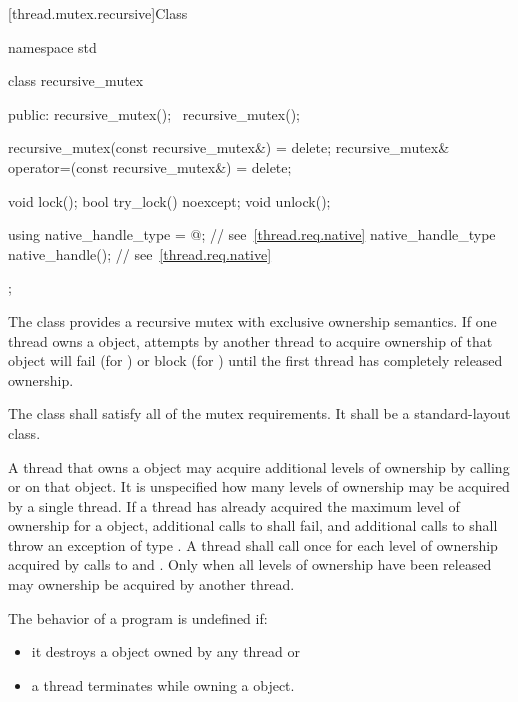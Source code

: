 [thread.mutex.recursive]{Class }

%
\begin{codeblock}
namespace std {
  class recursive_mutex {
  public:
    recursive_mutex();
    ~recursive_mutex();

    recursive_mutex(const recursive_mutex&) = delete;
    recursive_mutex& operator=(const recursive_mutex&) = delete;

    void lock();
    bool try_lock() noexcept;
    void unlock();

    using native_handle_type = @\impdefnc@;          // see~\ref{thread.req.native}
    native_handle_type native_handle();                         // see~\ref{thread.req.native}
  };
}
\end{codeblock}

\pnum
The class  provides a recursive mutex with exclusive ownership
semantics. If one thread owns a  object, attempts by another
thread to acquire ownership of that object will fail (for ) or block
(for ) until the first thread has completely released ownership.

\pnum
The class  shall satisfy all of the mutex
requirements. It shall be a standard-layout
class.

\pnum
A thread that owns a  object may acquire additional levels of
ownership by calling  or  on that object. It is
unspecified how many levels of ownership may be acquired by a single thread. If a thread
has already acquired the maximum level of ownership for a 
object, additional calls to  shall fail, and additional calls to
 shall throw an exception of type . A thread
shall call  once for each level of ownership acquired by calls to
 and . Only when all levels of ownership have been
released may ownership be acquired by another thread.

\pnum
The behavior of a program is undefined if:

\begin{itemize}
\item it destroys a  object owned by any thread or
\item a thread terminates while owning a  object.
\end{itemize}

